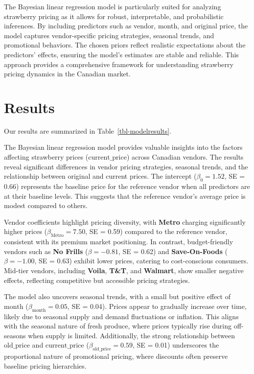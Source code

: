\documentclass[
  letterpaper,
  DIV=11,
  numbers=noendperiod]{scrartcl}
\begin{document}
The Bayesian linear regression model is particularly suited for
analyzing strawberry pricing as it allows for robust, interpretable, and
probabilistic inferences. By including predictors such as vendor, month,
and original price, the model captures vendor-specific pricing
strategies, seasonal trends, and promotional behaviors. The chosen
priors reflect realistic expectations about the predictors' effects,
ensuring the model's estimates are stable and reliable. This approach
provides a comprehensive framework for understanding strawberry pricing
dynamics in the Canadian market.

\section{Results}\label{sec-result}

Our results are summarized in Table~\ref{tbl-modelresults}.

The Bayesian linear regression model provides valuable insights into the
factors affecting strawberry prices (\(\text{current\_price}\)) across
Canadian vendors. The results reveal significant differences in vendor
pricing strategies, seasonal trends, and the relationship between
original and current prices. The intercept (\(\beta_0 = 1.52\), SE =
0.66) represents the baseline price for the reference vendor when all
predictors are at their baseline levels. This suggests that the
reference vendor's average price is modest compared to others.

Vendor coefficients highlight pricing diversity, with \textbf{Metro}
charging significantly higher prices (\(\beta_{\text{Metro}} = 7.50\),
SE = 0.59) compared to the reference vendor, consistent with its premium
market positioning. In contrast, budget-friendly vendors such as
\textbf{No Frills} (\(\beta = -0.81\), SE = 0.62) and
\textbf{Save-On-Foods} (\(\beta = -1.00\), SE = 0.63) exhibit lower
prices, catering to cost-conscious consumers. Mid-tier vendors,
including \textbf{Voila}, \textbf{T\&T}, and \textbf{Walmart}, show
smaller negative effects, reflecting competitive but accessible pricing
strategies.

The model also uncovers seasonal trends, with a small but positive
effect of \(\text{month}\) (\(\beta_{\text{month}} = 0.05\), SE = 0.04).
Prices appear to gradually increase over time, likely due to seasonal
supply and demand fluctuations or inflation. This aligns with the
seasonal nature of fresh produce, where prices typically rise during
off-seasons when supply is limited. Additionally, the strong
relationship between \(\text{old\_price}\) and \(\text{current\_price}\)
(\(\beta_{\text{old\_price}} = 0.59\), SE = 0.01) underscores the
proportional nature of promotional pricing, where discounts often
preserve baseline pricing hierarchies.
\end{document}
